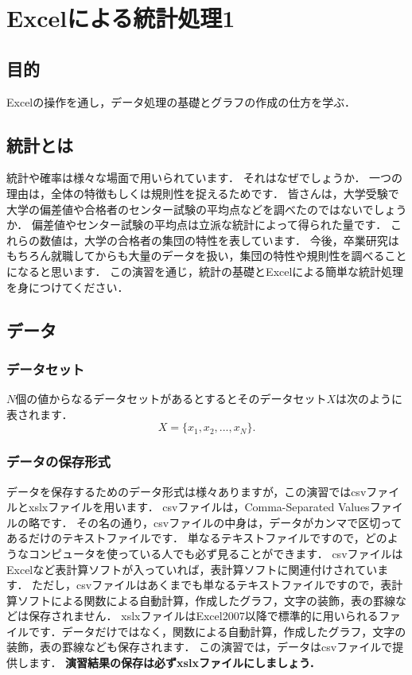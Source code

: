
\chapter{Excelによる統計処理1}
\setcounter{num_prac}{0}

\section{目的}

Excelの操作を通し，データ処理の基礎とグラフの作成の仕方を学ぶ．

\section{統計とは}

統計や確率は様々な場面で用いられています．
それはなぜでしょうか．
一つの理由は，全体の特徴もしくは規則性を捉えるためです．
皆さんは，大学受験で大学の偏差値や合格者のセンター試験の平均点などを調べたのではないでしょうか．
偏差値やセンター試験の平均点は立派な統計によって得られた量です．
これらの数値は，大学の合格者の集団の特性を表しています．
今後，卒業研究はもちろん就職してからも大量のデータを扱い，集団の特性や規則性を調べることになると思います．
この演習を通じ，統計の基礎とExcelによる簡単な統計処理を身につけてください．

\section{データ}
\subsection{データセット}

$N$個の値からなるデータセットがあるとするとそのデータセット$X$は次のように表されます．
\begin{equation}
    \label{eq:2}
    X = \{x_1, x_2, ..., x_N\}.
\end{equation}

\subsection{データの保存形式}

データを保存するためのデータ形式は様々ありますが，この演習ではcsvファイルとxslxファイルを用います．
csvファイルは，Comma-Separated Valuesファイルの略です．
その名の通り，csvファイルの中身は，データがカンマで区切ってあるだけのテキストファイルです．
単なるテキストファイルですので，どのようなコンピュータを使っている人でも必ず見ることができます．
csvファイルはExcelなど表計算ソフトが入っていれば，表計算ソフトに関連付けされています．
ただし，csvファイルはあくまでも単なるテキストファイルですので，表計算ソフトによる関数による自動計算，作成したグラフ，文字の装飾，表の罫線などは保存されません．
xslxファイルはExcel2007以降で標準的に用いられるファイルです．データだけではなく，関数による自動計算，作成したグラフ，文字の装飾，表の罫線なども保存されます．
この演習では，データはcsvファイルで提供します．
\textbf{演習結果の保存は必ずxslxファイルにしましょう．}

